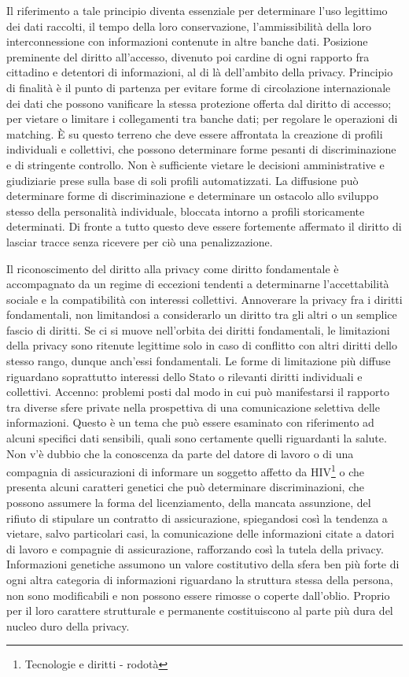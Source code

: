 Il riferimento a tale principio diventa essenziale per determinare l’uso legittimo dei dati raccolti, il tempo della loro conservazione, l’ammissibilità della loro interconnessione con informazioni contenute in altre banche dati.
Posizione preminente del diritto all’accesso, divenuto poi cardine di ogni rapporto fra cittadino e detentori di informazioni, al di là dell’ambito della privacy.
Principio di finalità è il punto di partenza per evitare forme di circolazione internazionale dei dati che possono vanificare la stessa protezione offerta dal diritto di accesso; per vietare o limitare i collegamenti tra banche dati; per regolare le operazioni di matching.
È su questo terreno che deve essere affrontata la creazione di profili individuali e collettivi, che possono determinare forme pesanti di discriminazione e di stringente controllo. Non è sufficiente vietare le decisioni amministrative e giudiziarie prese sulla base di soli profili automatizzati. La diffusione può determinare forme di discriminazione e determinare un ostacolo allo sviluppo stesso della personalità individuale, bloccata intorno a profili storicamente determinati. Di fronte a tutto questo deve essere fortemente affermato il diritto di lasciar tracce senza ricevere per ciò una penalizzazione.

Il riconoscimento del diritto alla privacy come diritto fondamentale è accompagnato da un regime di eccezioni tendenti a determinarne l’accettabilità sociale e la compatibilità con interessi collettivi.
Annoverare la privacy fra i diritti fondamentali, non limitandosi a considerarlo un diritto tra gli altri o un semplice fascio di diritti. Se ci si muove nell’orbita dei diritti fondamentali, le limitazioni della privacy sono ritenute legittime solo in caso di conflitto con altri diritti dello stesso rango, dunque anch’essi fondamentali.
Le forme di limitazione più diffuse riguardano soprattutto interessi dello Stato o rilevanti diritti individuali e collettivi.
Accenno: problemi posti dal modo in cui può manifestarsi il rapporto tra diverse sfere private nella prospettiva di una comunicazione selettiva delle informazioni. Questo è un tema che può essere esaminato con riferimento ad alcuni specifici dati sensibili, quali sono certamente quelli riguardanti la salute. Non v’è dubbio che la conoscenza da parte del datore di lavoro o di una compagnia di assicurazioni di informare un soggetto affetto da HIV\footnote{Tecnologie e diritti -  rodotà} o che presenta alcuni caratteri genetici che può determinare discriminazioni, che possono assumere la forma del licenziamento, della mancata assunzione, del rifiuto di stipulare un contratto di assicurazione, spiegandosi così la tendenza a vietare, salvo particolari casi, la comunicazione delle informazioni citate a datori di lavoro e compagnie di assicurazione, rafforzando così la tutela della privacy.
Informazioni genetiche assumono un valore costitutivo della sfera ben più forte di ogni altra categoria di informazioni riguardano la struttura stessa della persona, non sono modificabili e non possono essere rimosse o coperte dall’oblio. Proprio per il loro carattere strutturale e permanente costituiscono al parte più dura del nucleo duro della privacy.

